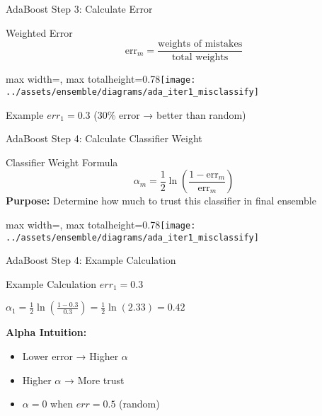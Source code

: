\documentclass[10pt]{beamer}
\newcommand{\fitpic}[1]{\begin{adjustbox}{max width=\linewidth, max totalheight=0.78\textheight}#1\end{adjustbox}}
\begin{document}
\begin{frame}{AdaBoost Step 3: Calculate Error}
\begin{definitionbox}{Weighted Error}
$$\text{err}_m = \frac{\text{weights of mistakes}}{\text{total weights}}$$
\end{definitionbox}

\begin{center}
\fitpic{\texttt{[image: ../assets/ensemble/diagrams/ada\_iter1\_misclassify]}}
\end{center}

\begin{examplebox}{Example}
$err_1 = 0.3$ (30\% error → better than random)
\end{examplebox}
\end{frame}


\begin{frame}{AdaBoost Step 4: Calculate Classifier Weight}
\begin{definitionbox}{Classifier Weight Formula}
$$\alpha_m = \frac{1}{2}\ln\left(\frac{1 - \text{err}_m}{\text{err}_m}\right)$$
\textbf{Purpose:} Determine how much to trust this classifier in final ensemble
\end{definitionbox}

\begin{center}
\fitpic{\texttt{[image: ../assets/ensemble/diagrams/ada\_iter1\_misclassify]}}
\end{center}
\end{frame}

\begin{frame}{AdaBoost Step 4: Example Calculation}
\begin{examplebox}{Example Calculation}
$err_1 = 0.3$

$\alpha_1 = \frac{1}{2}\ln\left(\frac{1-0.3}{0.3}\right) = \frac{1}{2}\ln(2.33) = 0.42$
\end{examplebox}

\begin{keypointsbox}
\textbf{Alpha Intuition:}
\begin{itemize}
\item Lower error → Higher $\alpha$
\item Higher $\alpha$ → More trust
\item $\alpha = 0$ when $err = 0.5$ (random)
\end{itemize}
\end{keypointsbox}
\end{frame}
\end{document}
